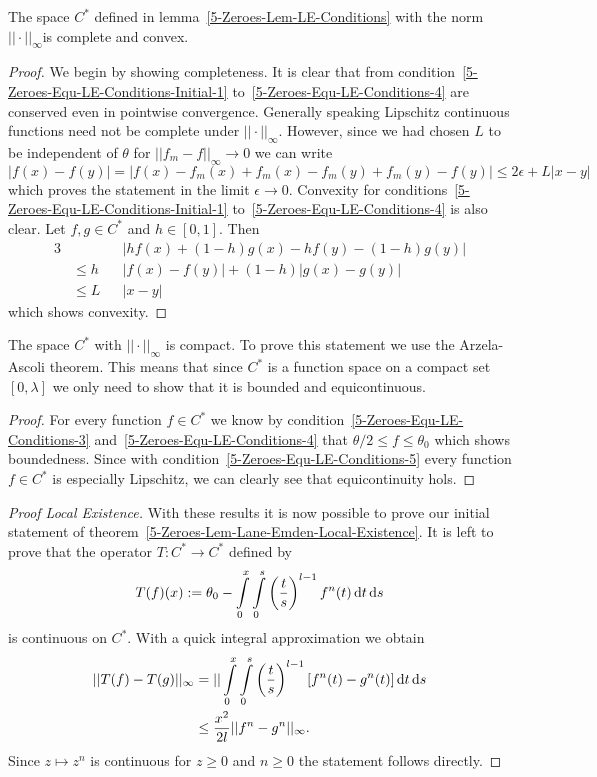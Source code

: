\begin{lemma}
	The space $C^*$ defined in lemma~\ref{5-Zeroes-Lem-LE-Conditions} with the norm $||\cdot||_\infty$is complete and convex.
\end{lemma}
\begin{proof}
	We begin by showing completeness.
	It is clear that from condition~\eqref{5-Zeroes-Equ-LE-Conditions-Initial-1} to~\eqref{5-Zeroes-Equ-LE-Conditions-4} are conserved even in pointwise convergence.
	Generally speaking Lipschitz continuous functions need not be complete under $||\cdot||_\infty$.
	However, since we had chosen $L$ to be independent of $\theta$ for $||f_m-f||_\infty\rightarrow0$ we can write
	\[
		|f(x)-f(y)|=|f(x)-f_m(x)+f_m(x)-f_m(y)+f_m(y)-f(y)|\leq 2\epsilon+L|x-y|
	\]
	which proves the statement in the limit $\epsilon\rightarrow0$.
	Convexity for conditions~\eqref{5-Zeroes-Equ-LE-Conditions-Initial-1} to~\eqref{5-Zeroes-Equ-LE-Conditions-4} is also clear.
	Let $f,g\in C^*$ and $h\in[0,1]$.
	Then
	\begin{alignat}{3}
		&&&|hf(x)+(1-h)g(x)-hf(y)-(1-h)g(y)|\\
		&\leq h&&|f(x)-f(y)|+ (1-h)|g(x)-g(y)|\\
		&\leq L&&|x-y|
	\end{alignat}
	which shows convexity.
\end{proof}\noindent
\begin{lemma}
	The space $C^*$ with $||\cdot||_\infty$ is compact.
	To prove this statement we use the Arzela-Ascoli theorem.
	This means that since $C^*$ is a function space on a compact set $[0,\lambda]$ we only need to show that it is bounded and equicontinuous.
\end{lemma}
\begin{proof}
	For every function $f\in C^*$ we know by condition~\eqref{5-Zeroes-Equ-LE-Conditions-3} and~\eqref{5-Zeroes-Equ-LE-Conditions-4} that $\theta/2\leq f\leq\theta_0$ which shows boundedness.
	Since with condition~\eqref{5-Zeroes-Equ-LE-Conditions-5} every function $f\in C^*$ is especially Lipschitz, we can clearly see that equicontinuity hols.
\end{proof}
\begin{proof}[Proof  Local Existence]
	With these results it is now possible to prove our initial statement of theorem~\ref{5-Zeroes-Lem-Lane-Emden-Local-Existence}.
	It is left to prove that the operator $T:C^*\rightarrow C^*$ defined by
	\begin{equation}
		T(f)(x) := \theta_0 - \int\limits_0^x\int\limits_0^s \left(\frac{t}{s}\right)^{l-1}f^n(t)\mathop{}\!\mathrm{d} t\mathop{}\!\mathrm{d} s
		\label{eq:5-Zeroes-LE-Definition-Operator-On-C-Star}
	\end{equation}
	is continuous on $C^*$.
	With a quick integral approximation we obtain
	\begin{align}
		||T(f)-T(g)||_{\infty} &= ||\int\limits_0^x\int\limits_0^s \left(\frac{t}{s}\right)^{l-1}\left[f^n(t)-g^n(t)\right]\mathop{}\!\mathrm{d} t\mathop{}\!\mathrm{d} s\\
		&\leq \frac{x^2}{2l}||f^n-g^n||_{\infty}.
	\end{align}
	Since $z\mapsto z^n$ is continuous for $z\geq0$ and $n\geq0$ the statement follows directly.
\end{proof}\noindent
